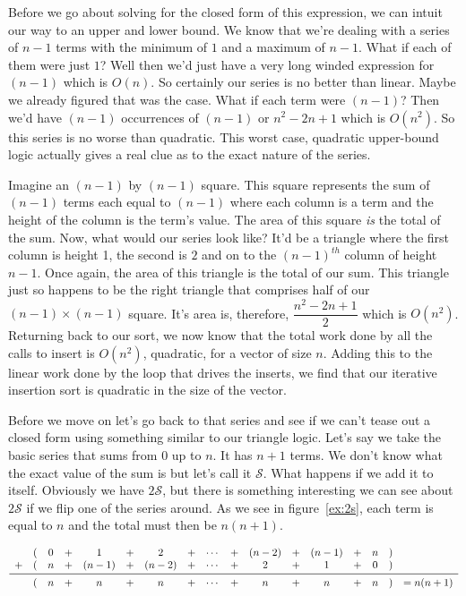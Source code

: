 \documentclass[]{tufte-handout}
\begin{document}
Before we go about solving for the closed form of this expression, we can intuit our way to an upper and lower bound.  We know that we're dealing with a series of $n-1$ terms with the minimum of $1$ and a maximum of $n-1$. What if each of them were just $1$? Well then we'd just have a very long winded expression for $(n-1)$ which is $O(n)$. So certainly our series is no better than linear. Maybe we already figured that was the case. What if each term were $(n-1)$? Then we'd have $(n-1)$ occurrences of $(n-1)$ or $n^2-2n+1$ which is $O(n^2)$. So this series is no worse than quadratic. This worst case, quadratic upper-bound logic actually gives a real clue as to the exact nature of the series.

Imagine an $(n-1)$ by $(n-1)$ square. This square represents the sum of $(n-1)$ terms each equal to $(n-1)$ where each column is a term and the height of the column is the term's value. The area of this square \textit{is} the total of the sum. Now, what would our series look like? It'd be a triangle where the first column is height 1, the second is $2$ and on to the ${(n-1)}^{th}$ column of height $n-1$. Once again, the area of this triangle is the total of our sum. This triangle just so happens to be the right triangle that comprises half of our $(n-1)\times(n-1)$ square. It's area is, therefore, $\dfrac{n^2-2n+1}{2}$ which is $O(n^2)$. Returning back to our sort, we now know that the total work done by all the calls to insert is $O(n^2)$, quadratic, for a vector of size $n$. Adding this to the linear work done by the loop that drives the inserts, we find that our iterative insertion sort is quadratic in the size of the vector.

Before we move on let's go back to that series and see if we can't tease out a closed form using something similar to our triangle logic. Let's say we take the basic series that sums from $0$ up to $n$. It has $n+1$ terms.  We don't know what the exact value of the sum is but let's call it $\mathcal{S}$. What happens if we add it to itself. Obviously we have $2\mathcal{S}$, but there is something interesting we can see about $2\mathcal{S}$ if we flip one of the series around. As we see in figure~\ref{ex:2s}, each term is equal to $n$ and the total must then be $n(n+1)$.
\begin{figure*}[!htpb]
\[
\begin{array}{ccccccccccccccccc}
  &(& 0 & + & 1     & + & 2    & + & \cdots & + & (n-2) & + & (n-1) & + & n & ) & \\
+ &(& n & + & (n-1) & + & (n-2)& + & \cdots & + & 2     & + & 1     & + & 0 & ) & \\ \midrule
  &(& n & + & n     & + & n    & + & \cdots & + & n     & + & n     & + & n & ) & = n(n+1)
\end{array}
\]
\caption{Adding $\mathcal{S}$ to itself}
\label{ex:2s}
\end{figure*}
\end{document}
